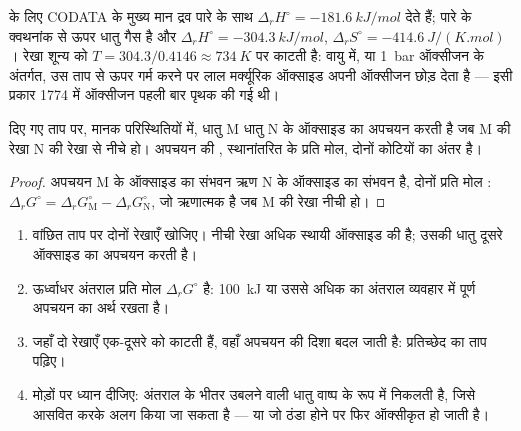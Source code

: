\begin{example}[पारे का ऑक्साइड]\label{ex:b2:ellingham:hgo}
 के लिए CODATA के मुख्य मान द्रव पारे के साथ $\Delta_r H^\circ =
\qty{-181.6}{kJ/mol}$ देते हैं; पारे के क्वथनांक से ऊपर
धातु गैस है और $\Delta_r H^\circ = \qty{-304.3}{kJ/mol}$, $\Delta_r
S^\circ = \qty{-414.6}{J/(K.mol)}$। रेखा शून्य को
$T = 304.3/0.4146 \approx \qty{734}{K}$ पर काटती है: वायु में,
या \qty{1}{bar} ऑक्सीजन के अंतर्गत, उस ताप से ऊपर गर्म करने पर लाल मर्क्यूरिक ऑक्साइड अपनी ऑक्सीजन छोड़ देता है ---
इसी प्रकार 1774 में ऑक्सीजन पहली बार पृथक की गई थी।
\end{example}

\begin{proposition}\label{prop:b2:ellingham:reduction}
दिए गए ताप पर, मानक परिस्थितियों में, धातु M धातु N के ऑक्साइड का अपचयन करती है
जब M की रेखा N की रेखा से नीचे हो। अपचयन की , स्थानांतरित  के प्रति मोल, दोनों
कोटियों का अंतर है।
\end{proposition}

\begin{proof}
अपचयन M के ऑक्साइड का संभवन ऋण N के ऑक्साइड का संभवन है, दोनों प्रति
मोल : $\Delta_r G^\circ = \Delta_r G^\circ_{\mathrm M} - \Delta_r
G^\circ_{\mathrm N}$, जो ऋणात्मक है जब M की रेखा नीची हो।
\end{proof}

\begin{method}[एलिंगम आरेख पढ़ना]\label{met:b2:ellingham:read-ellingham}
\begin{enumerate}
  \item वांछित ताप पर दोनों रेखाएँ खोजिए। नीची रेखा
        अधिक स्थायी ऑक्साइड की है; उसकी धातु दूसरे ऑक्साइड का अपचयन करती है।
  \item ऊर्ध्वाधर अंतराल प्रति मोल  $\Delta_r G^\circ$ है:
        \qty{100}{kJ} या उससे अधिक का अंतराल व्यवहार में पूर्ण अपचयन का अर्थ रखता है।
  \item जहाँ दो रेखाएँ एक-दूसरे को काटती हैं, वहाँ अपचयन की दिशा बदल जाती है:
        प्रतिच्छेद का ताप पढ़िए।
  \item मोड़ों पर ध्यान दीजिए: अंतराल के भीतर उबलने वाली धातु
        वाष्प के रूप में निकलती है, जिसे आसवित करके अलग किया जा सकता है --- या जो ठंडा होने पर फिर ऑक्सीकृत हो जाती है।
\end{enumerate}
\end{method}

